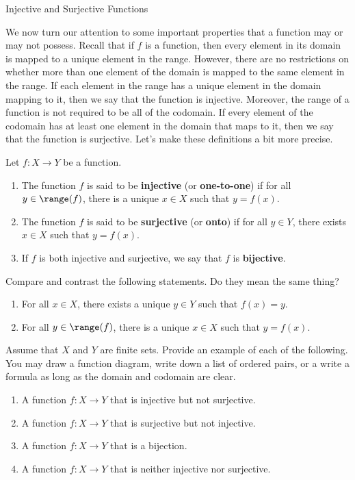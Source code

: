 \begin{section}{Injective and Surjective Functions}

We now turn our attention to some important properties that a function may or may not possess. Recall that if $f$ is a function, then every element in its domain is mapped to a unique element in the range.  However, there are no restrictions on whether more than one element of the domain is mapped to the same element in the range. If each element in the range has a unique element in the domain mapping to it, then we say that the function is injective. Moreover, the range of a function is not required to be all of the codomain.  If every element of the codomain has at least one element in the domain that maps to it, then we say that the function is surjective.  Let's make these definitions a bit more precise.

\begin{definition}
Let $f:X\to Y$ be a function.
\begin{enumerate}[label=\textrm{(\alph*)}]
\item The function $f$ is said to be \textbf{injective} (or \textbf{one-to-one}) if for all $y\in \range(f)$, there is a unique $x\in X$ such that $y=f(x)$.
\item The function $f$ is said to be \textbf{surjective} (or \textbf{onto}) if for all $y\in Y$, there exists $x\in X$ such that $y=f(x)$.
\item If $f$ is both injective and surjective, we say that $f$ is \textbf{bijective}.
\end{enumerate}
\end{definition}

\begin{problem}
Compare and contrast the following statements.  Do they mean the same thing?
\begin{enumerate}[label=\textrm{(\alph*)}]
\item For all $x\in X$, there exists a unique $y\in Y$ such that $f(x)=y$.
\item For all $y\in \range(f)$, there is a unique $x\in X$ such that $y=f(x)$.
\end{enumerate}
\end{problem}

\begin{problem}
Assume that $X$ and $Y$ are finite sets. Provide an example of each of the following.  You may draw a function diagram, write down a list of ordered pairs, or a write a formula as long as the domain and codomain are clear. 
\begin{enumerate}[label=\textrm{(\alph*)}]
\item A function $f:X\to Y$ that is injective but not surjective.
\item A function $f:X\to Y$ that is surjective but not injective.
\item A function $f:X\to Y$ that is a bijection.
\item A function $f:X\to Y$ that is neither injective nor surjective.
\end{enumerate}
\end{problem}


\end{section}
